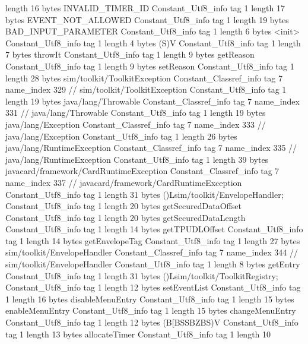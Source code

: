 {{{			length	16
			bytes	INVALID_TIMER_ID
		}
		Constant_Utf8_info {
			tag	1
			length	17
			bytes	EVENT_NOT_ALLOWED
		}
		Constant_Utf8_info {
			tag	1
			length	19
			bytes	BAD_INPUT_PARAMETER
		}
		Constant_Utf8_info {
			tag	1
			length	6
			bytes	<init>
		}
		Constant_Utf8_info {
			tag	1
			length	4
			bytes	(S)V
		}
		Constant_Utf8_info {
			tag	1
			length	7
			bytes	throwIt
		}
		Constant_Utf8_info {
			tag	1
			length	9
			bytes	getReason
		}
		Constant_Utf8_info {
			tag	1
			length	9
			bytes	setReason
		}
		Constant_Utf8_info {
			tag	1
			length	28
			bytes	sim/toolkit/ToolkitException
		}
		Constant_Classref_info {
			tag	7
			name_index	329		// sim/toolkit/ToolkitException
		}
		Constant_Utf8_info {
			tag	1
			length	19
			bytes	java/lang/Throwable
		}
		Constant_Classref_info {
			tag	7
			name_index	331		// java/lang/Throwable
		}
		Constant_Utf8_info {
			tag	1
			length	19
			bytes	java/lang/Exception
		}
		Constant_Classref_info {
			tag	7
			name_index	333		// java/lang/Exception
		}
		Constant_Utf8_info {
			tag	1
			length	26
			bytes	java/lang/RuntimeException
		}
		Constant_Classref_info {
			tag	7
			name_index	335		// java/lang/RuntimeException
		}
		Constant_Utf8_info {
			tag	1
			length	39
			bytes	javacard/framework/CardRuntimeException
		}
		Constant_Classref_info {
			tag	7
			name_index	337		// javacard/framework/CardRuntimeException
		}
		Constant_Utf8_info {
			tag	1
			length	31
			bytes	()Lsim/toolkit/EnvelopeHandler;
		}
		Constant_Utf8_info {
			tag	1
			length	20
			bytes	getSecuredDataOffset
		}
		Constant_Utf8_info {
			tag	1
			length	20
			bytes	getSecuredDataLength
		}
		Constant_Utf8_info {
			tag	1
			length	14
			bytes	getTPUDLOffset
		}
		Constant_Utf8_info {
			tag	1
			length	14
			bytes	getEnvelopeTag
		}
		Constant_Utf8_info {
			tag	1
			length	27
			bytes	sim/toolkit/EnvelopeHandler
		}
		Constant_Classref_info {
			tag	7
			name_index	344		// sim/toolkit/EnvelopeHandler
		}
		Constant_Utf8_info {
			tag	1
			length	8
			bytes	getEntry
		}
		Constant_Utf8_info {
			tag	1
			length	31
			bytes	()Lsim/toolkit/ToolkitRegistry;
		}
		Constant_Utf8_info {
			tag	1
			length	12
			bytes	setEventList
		}
		Constant_Utf8_info {
			tag	1
			length	16
			bytes	disableMenuEntry
		}
		Constant_Utf8_info {
			tag	1
			length	15
			bytes	enableMenuEntry
		}
		Constant_Utf8_info {
			tag	1
			length	15
			bytes	changeMenuEntry
		}
		Constant_Utf8_info {
			tag	1
			length	12
			bytes	(B[BSSBZBS)V
		}
		Constant_Utf8_info {
			tag	1
			length	13
			bytes	allocateTimer
		}
		Constant_Utf8_info {
			tag	1
			length	10
}}}
